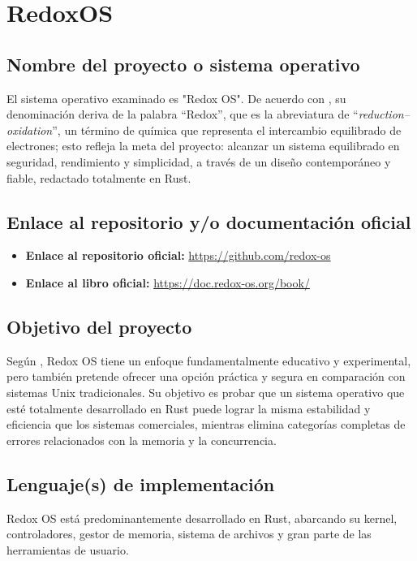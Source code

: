 \section{RedoxOS}

\subsection{Nombre del proyecto o sistema operativo}

El sistema operativo examinado es "Redox OS". De acuerdo con \citep{redox_docs}, su denominación deriva de la palabra “Redox”, que es la abreviatura de “\textit{reduction–oxidation}”, un término de química que representa el intercambio equilibrado de electrones; esto refleja la meta del proyecto: alcanzar un sistema equilibrado en seguridad, rendimiento y simplicidad, a través de un diseño contemporáneo y fiable, redactado totalmente en Rust.

\subsection{Enlace al repositorio y/o documentación oficial}

\begin{itemize}
    \item \textbf{Enlace al repositorio oficial:} \url{https://github.com/redox-os} 
    \item \textbf{Enlace al libro oficial:} \url{https://doc.redox-os.org/book/}
\end{itemize}
\subsection{Objetivo del proyecto}
Según \citep{redox_docs, redox_github}, Redox OS tiene un enfoque fundamentalmente educativo y experimental, pero también pretende ofrecer una opción práctica y segura en comparación con sistemas Unix tradicionales. Su objetivo es probar que un sistema operativo que esté totalmente desarrollado en Rust puede lograr la misma estabilidad y eficiencia que los sistemas comerciales, mientras elimina categorías completas de errores relacionados con la memoria y la concurrencia.

\subsection{Lenguaje(s) de implementación}
Redox OS está predominantemente desarrollado en Rust, abarcando su kernel, controladores, gestor de memoria, sistema de archivos y gran parte de las herramientas de usuario.

